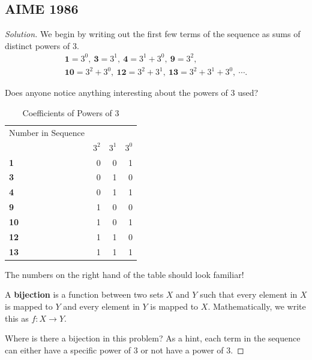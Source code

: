 \subsection{AIME 1986}
\begin{proof}[Solution]
We begin by writing out the first few terms of the sequence as sums of distinct powers of $3$.  \begin{eqnarray*}\textbf{1}=3^0,\: \textbf{3}=3^1,\:\textbf{4}=3^1+3^0,\: \textbf{9}=3^2,\: \\ \textbf{10}=3^2+3^0,\: \textbf{12}=3^2+3^1,\: \textbf{13}=3^2+3^1+3^0,\: \cdots. \end{eqnarray*}

Does anyone notice anything interesting about the powers of $3$ used?

\clearpage


\begin{table}[h]
	\centering
	\begin{tabular}{|l | r r r|}
		\toprule
		Number in Sequence & & &\\
		                   & $3^2$ & $3^1$ & $3^0$ \\ 
		\midrule
		\textbf{1} & 0 & 0 & 1 \\
		\textbf{3} & 0 & 1 & 0 \\
		\textbf{4} & 0 & 1 & 1 \\
		\textbf{9} & 1 & 0 & 0 \\
		\textbf{10} & 1 & 0 & 1 \\
		\textbf{12} & 1 & 1 & 0 \\
		\textbf{13} & 1 & 1 & 1 \\
		\bottomrule
	\end{tabular}
	\caption{Coefficients of Powers of 3}
	\label{tab-pow3}
\end{table}


\clearpage

The numbers on the right hand of the table should look familiar!
\newline
\begin{defi}  A \textbf{bijection} is a function between two sets $X$ and $Y$ such that every element in $X$ is mapped to $Y$ and every element in $Y$ is mapped to $X$. Mathematically, we write this as $f:X\to Y$.  \end{defi}

Where is there a bijection in this problem? As a hint, each term in the sequence can either have a specific power of $3$ or not have a power of $3$. 

\clearpage


\end{proof}
